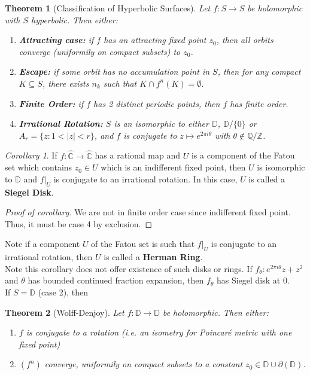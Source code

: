\documentclass[a4paper, 11pt]{book}
\newtheorem{theorem}{Theorem}
\theoremstyle{definition}
\theoremstyle{remark}
\newtheorem{corollary}{Corollary}[theorem]
\begin{document}
    \begin{theorem}[Classification of Hyperbolic Surfaces]
        Let $f:S\to S$ be holomorphic with $S$ hyperbolic. Then either:
        \begin{enumerate}
            \item \textbf{Attracting case:} if $f$ has an attracting fixed point $z_0$, then all orbits converge (uniformily on compact
                subsets) to $z_0$.
            \item \textbf{Escape:} if some orbit has no accumulation point in $S$, then for any compact $K\subseteq S$, there exists
                $n_k$ such that $K\cap f^n(K) = \emptyset$.
            \item \textbf{Finite Order:} if $f$ has 2 distinct periodic points, then $f$ has finite order.
            \item \textbf{Irrational Rotation:} $S$ is an isomorphic to either $\mathbb{D}$, $\mathbb{D}/\{0\}$ or $A_r =
                \{z: 1<|z|<r\}$, and $f$ is conjugate to $z\mapsto e^{2\pi i\theta}$ with $\theta\not\in\mathbb{Q}/\mathbb{Z}$.
        \end{enumerate}
    \end{theorem}

    \begin{corollary}
        If $f:\hat{\mathbb{C}}\to\hat{\mathbb{C}}$ has a rational map and $U$ is a component of the Fatou set which contains
        $z_0\in U$ which is an indifferent fixed point, then $U$ is isomorphic to $\mathbb{D}$ and $f|_U$ is conjugate to an
        irrational rotation. In this case, $U$ is called a \textbf{Siegel Disk}.
    \end{corollary}

    \begin{proof}[Proof of corollary]
        We are not in finite order case since indifferent fixed point. Thus, it must be case 4 by exclusion.
    \end{proof}

    Note if a component $U$ of the Fatou set is such that $f|_U$ is conjugate to an irrational rotation, then $U$ is called a
    \textbf{Herman Ring}.\\

    Note this corollary does not offer existence of such disks or rings. If $f_{\theta}:e^{2\pi i\theta}z + z^2$ and
    $\theta$ has bounded continued fraction expansion, then $f_{\theta}$ has Siegel disk at 0.\\

    If $S = \mathbb{D}$ (case 2), then
    \begin{theorem}[Wolff-Denjoy]
        Let $f:\mathbb{D}\to\mathbb{D}$ be holomorphic. Then either:
        \begin{enumerate}
            \item $f$ is conjugate to a rotation (i.e. an isometry for Poincaré metric with one fixed point)
            \item $(f^n)$ converge, uniformily on compact subsets to a constant $z_0\in\mathbb{D}\cup\partial{(\mathbb{D})}$.
        \end{enumerate}
    \end{theorem}
\end{document}

